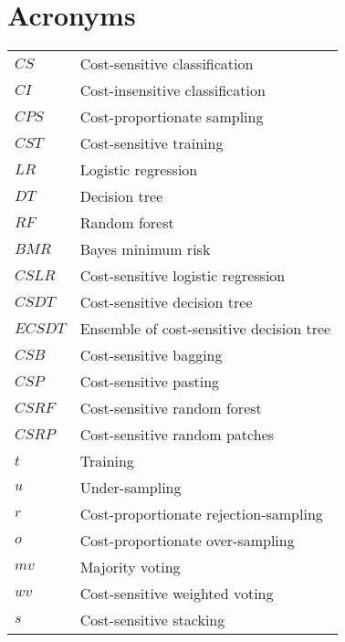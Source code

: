 \chapter*{Acronyms}

\begin{tabularx}{\textwidth}{ l X }
$CS$ 		& Cost-sensitive classification \\
$CI$    & Cost-insensitive classification \\ 
$CPS$    & Cost-proportionate sampling \\
$CST$    & Cost-sensitive training \\ 
$LR$  & Logistic regression \\
$DT$  & Decision tree  \\
$RF$ &  Random forest  \\
$BMR$ & Bayes minimum risk \\
$CSLR$ & Cost-sensitive logistic regression  \\
$CSDT$ & Cost-sensitive decision tree  \\
$ECSDT$ & Ensemble of cost-sensitive decision tree \\
$CSB$ & Cost-sensitive bagging\\
$CSP$ & Cost-sensitive pasting\\
$CSRF$ & Cost-sensitive random forest  \\
$CSRP$ & Cost-sensitive random patches  \\
$t$ & Training \\
$u$ & Under-sampling \\
$r$ & Cost-proportionate rejection-sampling \\
$o$ & Cost-proportionate over-sampling \\
$mv$ & Majority voting \\
$wv$ & Cost-sensitive weighted voting \\
$s$ & Cost-sensitive stacking \\
\end{tabularx}
